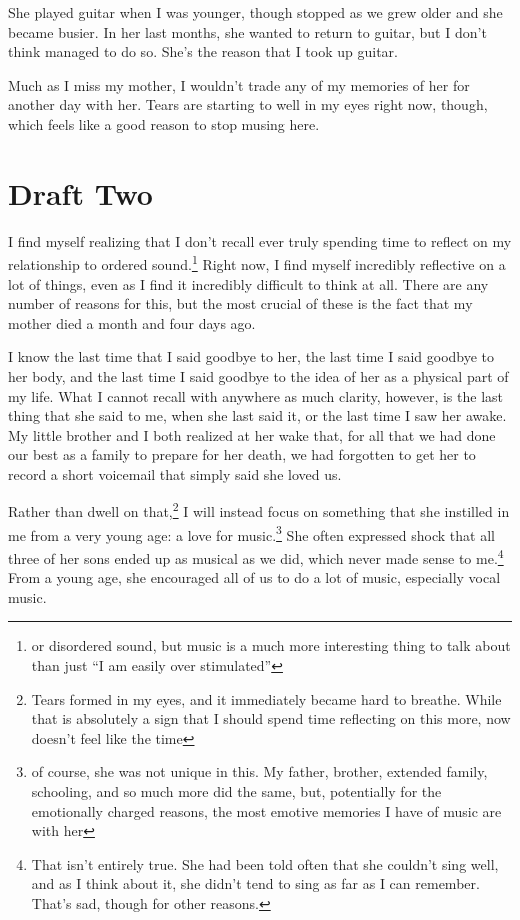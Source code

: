 \documentclass[12pt]{article}[titlepage]
\newcommand{\say}[1]{``#1''}
\newcommand{\1}{\={a}}
\newcommand{\2}{\={e}}
\newcommand{\3}{\={\i}}
\newcommand{\4}{\=o}
\newcommand{\5}{\=u}
\newcommand{\6}{\={A}}
\renewcommand{\,}{\textsuperscript{,}}
\begin{document}
She played guitar when I was younger, though stopped as we grew older and she became busier.  
In her last months, she wanted to return to guitar, but I don't think managed to do so.  
She's the reason that I took up guitar.

Much as I miss my mother, I wouldn't trade any of my memories of her for another day with her.  
Tears are starting to well in my eyes right now, though, which feels like a good reason to stop musing here.  


\section{Draft Two}

I find myself realizing that I don't recall ever truly spending time to reflect on my relationship to ordered sound.\footnote{or disordered sound, but music is a much more interesting thing to talk about than just \say{I am easily over stimulated}}  
Right now, I find myself incredibly reflective on a lot of things, even as I find it incredibly difficult to think at all.  
There are any number of reasons for this, but the most crucial of these is the fact that my mother died a month and four days ago.

I know the last time that I said goodbye to her, the last time I said goodbye to her body, and the last time I said goodbye to the idea of her as a physical part of my life.  
What I cannot recall with anywhere as much clarity, however, is the last thing that she said to me, when she last said it, or the last time I saw her awake.  
My little brother and I both realized at her wake that, for all that we had done our best as a family to prepare for her death, we had forgotten to get her to record a short voicemail that simply said she loved us.

Rather than dwell on that,\footnote{Tears formed in my eyes, and it immediately became hard to breathe. While that is absolutely a sign that I should spend time reflecting on this more, now doesn't feel like the time} I will instead focus on something that she instilled in me from a very young age: a love for music.\footnote{of course, she was not unique in this. My father, brother, extended family, schooling, and so much more did the same, but, potentially for the emotionally charged reasons, the most emotive memories I have of music are with her}  
She often expressed shock that all three of her sons ended up as musical as we did, which never made sense to me.\footnote{That isn't entirely true. She had been told often that she couldn't sing well, and as I think about it, she didn't tend to sing as far as I can remember. That's sad, though for other reasons.}  
From a young age, she encouraged all of us to do a lot of music, especially vocal music.
\end{document}
